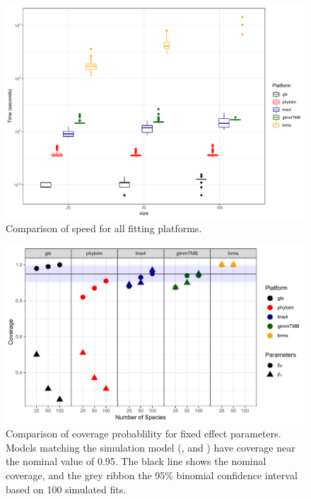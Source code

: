 \documentclass[12pt]{article}
\begin{document}
\begin{center}
\begin{figure}[H]
  \includegraphics[scale=0.7]{./figure/sstime.pdf}
  \caption{Comparison of speed for all fitting platforms.}
\label{ssplot_speed}
\end{figure}
\end{center}


\begin{center}
\begin{figure}[H]
  \includegraphics[scale=0.7]{./figure/sscoverage.pdf}
  \caption{Comparison of coverage probablility for fixed effect parameters. Models matching the simulation model (,  and ) have coverage near the nominal value of 0.95. The black line shows the nominal coverage, and the grey ribbon the 95\% binomial confidence interval based on 100 simulated fits. 
  }
\label{ssplot_coverage}
\end{figure}
\end{center}
\end{document}
